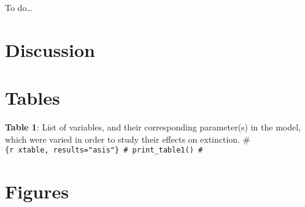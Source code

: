 \documentclass{article}
\begin{document}
To do\ldots{}

\section*{Discussion}

\newpage
\section*{Tables}

\textbf{Table 1}: List of variables, and their corresponding
parameter(s) in the model, which were varied in order to study their
effects on extinction. \#
\texttt{\{r\ xtable,\ results="asis"\}\ \#\ print\_table1()\ \#}

\newpage
\section*{Figures}



\end{document}

